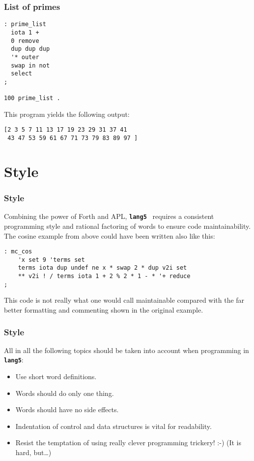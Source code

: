 \documentclass{beamer}
\newcommand*{\NIX}{\vspace*{.3cm}\\}
\newcommand*{\F}{{\tt\bf lang5}}
\begin{document}
%
  \begin{frame}[containsverbatim]
   \frametitle{List of primes}
   \begin{verbatim}
: prime_list
  iota 1 +
  0 remove
  dup dup dup
  '* outer
  swap in not
  select
;

100 prime_list .
   \end{verbatim}

   This program yields the following output:
   \begin{verbatim}
[2 3 5 7 11 13 17 19 23 29 31 37 41 
 43 47 53 59 61 67 71 73 79 83 89 97 ]
   \end{verbatim}
  \end{frame}
%
 \section{Style}
  \begin{frame}[containsverbatim]
   \frametitle{Style}
   Combining the power of Forth and APL, \F{ } requires a consistent 
   programming style and rational factoring of words to ensure code
   maintainability. 
   \NIX
   The cosine example from above could have been written also like this:
   \begin{verbatim}
: mc_cos 
    'x set 9 'terms set
    terms iota dup undef ne x * swap 2 * dup v2i set 
    ** v2i ! / terms iota 1 + 2 % 2 * 1 - * '+ reduce
;
   \end{verbatim}

   This code is not really what one would call maintainable compared with the
   far better formatting and commenting shown in the original example.
  \end{frame}
%
  \begin{frame}
   \frametitle{Style}
   All in all the following topics should be taken into account when programming
   in \F:
   \begin{itemize}
    \item Use short word definitions.
    \item Words should do only one thing.
    \item Words should have no side effects.
    \item Indentation of control and data structures is vital for readability.
    \item Resist the temptation of using really clever programming trickery!
     :-) (It is hard, but\dots)
   \end{itemize}
  \end{frame}
%
\end{document}
